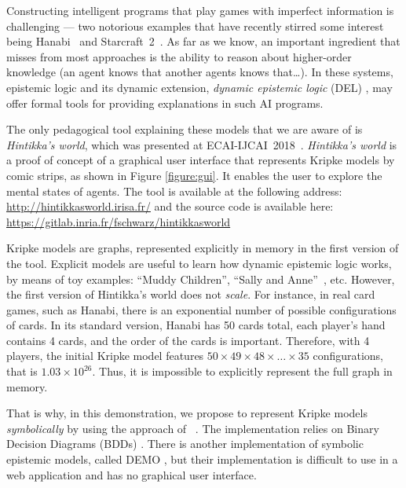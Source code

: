 Constructing intelligent programs that play games with imperfect information is challenging --- two notorious examples that have recently stirred some interest being Hanabi~\cite{DBLP:journals/corr/abs-1902-00506} and Starcraft~2~\cite{DBLP:conf/ijcai/HuLLPX18}. As far as we know, an important ingredient that misses from most approaches is the ability to reason about higher-order knowledge (an agent knows that another agents knows that\dots). In these systems, epistemic logic and its dynamic extension, \emph{dynamic epistemic logic} (DEL) \cite{baltag1998logic}, \cite{DitmarschvdHoekKooi} may offer formal tools for providing explanations in such AI programs. 

The only pedagogical tool explaining these models that we are aware of is \emph{Hintikka's world}, which was presented at ECAI-IJCAI~2018~\cite{DBLP:conf/ijcai/Schwarzentruber18}. 
\emph{Hintikka's world} is a proof of concept of a graphical user interface that represents Kripke models by  comic strips, as shown in Figure \ref{figure:gui}. It enables the user to explore the mental states of agents. The tool is available at the following address:
\url{http://hintikkasworld.irisa.fr/} and the source code is available here:
\url{https://gitlab.inria.fr/fschwarz/hintikkasworld}


Kripke models are graphs, represented explicitly in memory in the first version of the tool. Explicit models are useful to learn how dynamic epistemic logic works, by means of toy examples: ``Muddy Children'', ``Sally and Anne''~\cite{wimmer1983beliefs}, etc.  However, the first version of Hintikka's world does not \emph{scale}. For instance, in real card games, such as Hanabi, there is an exponential number of possible configurations of cards. In its standard version, Hanabi has 50 cards total, each player's hand contains 4 cards, and the order of the cards is important. Therefore, with 4 players, the initial Kripke model features $50 \times 49 \times 48 \times \dots \times 35$ configurations, that is %
$1.03 \times 10^{26}$.
Thus, it is impossible to explicitly represent the full graph in memory.



That is why, in this demonstration, we propose to represent Kripke models \emph{symbolically} by using the approach of \citeauthor{DBLP:conf/atal/CharrierS17}~. The implementation relies on Binary Decision Diagrams (BDDs) \cite{DBLP:journals/tc/Bryant86}. There is another implementation of symbolic epistemic models, called DEMO \cite{DBLP:conf/lori/BenthemEGS15}, but their implementation is difficult to use in a web application and has no graphical user interface. %






